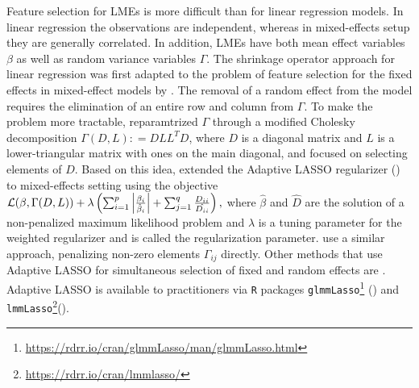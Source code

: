  Feature selection for LMEs is more difficult than for linear regression models. 
 In linear regression the observations are independent, whereas in mixed-effects setup they are generally correlated. 
 In addition, LMEs have both mean effect variables  $\beta$ as well as random variance variables 
 $\Gamma$. %
The shrinkage operator approach for linear regression 
\citep{Tibshirani1996} was first adapted 
to the problem of feature selection for the fixed effects in mixed-effect models by \cite{Lan2006}. 
The removal of a random effect from the model requires the elimination of an entire row and column from $\Gamma$. 
To make the problem more tractable, \cite{Chen2003} reparamtrized $\Gamma$ through a modified Cholesky decomposition $\Gamma(D,L): = DLL^TD$, where $D$ is a diagonal matrix and $L$ is a lower-triangular matrix with ones on the main diagonal, and focused on selecting elements of $D$. 
Based on this idea, \cite{Krishna2008} extended the Adaptive LASSO regularizer (\cite{Lan2006, Xu2015}) to mixed-effects setting using the objective
   \(
        \operatorname{\mathcal{L}}(\beta, \Gamma(D,L)) + \lambda\left(\sum_{i = 1}^p 
        \left|\frac{\beta_i}{\hat\beta_i}\right| + \sum_{j = 1}^q \frac{D_{ii}}{\hat{D_{ii}}} \right),
   \)
 where $\hat\beta$ and $\hat{D}$ are the solution of a non-penalized maximum likelihood problem and $\lambda$ is a tuning parameter for the weighted regularizer
 and is called the regularization parameter. 
 \cite{Ibrahim2011} use a similar approach, penalizing  non-zero elements $\Gamma_{ij}$ directly. 
 Other methods that use Adaptive LASSO for simultaneous selection 
 of fixed and random effects are \cite{Lin2013, fan2014robust, pan2018simultaneous}. Adaptive LASSO is available to practitioners via \texttt{R} packages \texttt{glmmLasso}\footnote{\href{https://rdrr.io/cran/glmmLasso/man/glmmLasso.html}{https://rdrr.io/cran/glmmLasso/man/glmmLasso.html}} (\cite{groll2014variable}) and \texttt{lmmLasso}\footnote{\href{https://rdrr.io/cran/lmmlasso/}{https://rdrr.io/cran/lmmlasso/}}(\cite{schelldorfer2011estimation}).


